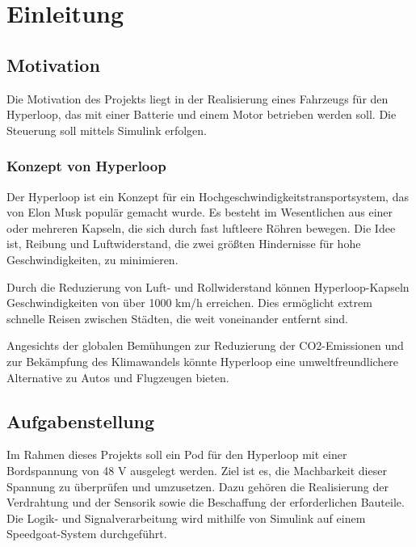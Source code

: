 \chapter{Einleitung}

\section{Motivation}

Die Motivation des Projekts liegt in der Realisierung eines Fahrzeugs für den Hyperloop, das mit einer Batterie und einem Motor betrieben werden soll. Die Steuerung soll mittels Simulink erfolgen.

\subsection{Konzept von Hyperloop}
Der Hyperloop ist ein Konzept für ein Hochgeschwindigkeitstransportsystem, das von Elon Musk \cite{Wikipedia:Hyperloop_impact} populär gemacht wurde. Es besteht im Wesentlichen aus einer oder mehreren Kapseln, die sich durch fast luftleere Röhren bewegen. Die Idee ist, Reibung und Luftwiderstand, die zwei größten Hindernisse für hohe Geschwindigkeiten, zu minimieren.

Durch die Reduzierung von Luft- und Rollwiderstand können Hyperloop-Kapseln Geschwindigkeiten von über 1000 km/h erreichen. Dies ermöglicht extrem schnelle Reisen zwischen Städten, die weit voneinander entfernt sind.

Angesichts der globalen Bemühungen zur Reduzierung der CO2-Emissionen und zur Bekämpfung des Klimawandels könnte Hyperloop eine umweltfreundlichere Alternative zu Autos und Flugzeugen bieten.\newline




\section{Aufgabenstellung}
Im Rahmen dieses Projekts soll ein Pod für den Hyperloop mit einer Bordspannung von 48 V ausgelegt werden. Ziel ist es, die Machbarkeit dieser Spannung zu überprüfen und umzusetzen. Dazu gehören die Realisierung der Verdrahtung und der Sensorik sowie die Beschaffung der erforderlichen Bauteile. Die Logik- und Signalverarbeitung wird mithilfe von Simulink auf einem Speedgoat-System durchgeführt.

